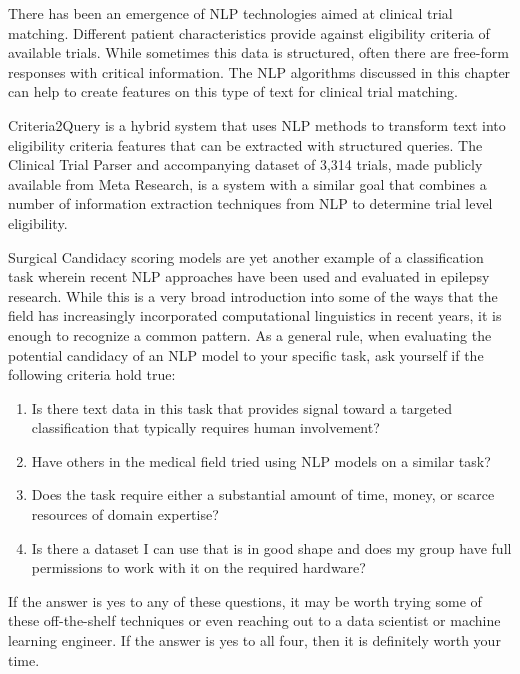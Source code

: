 There has been an emergence of NLP technologies aimed at clinical trial matching. Different patient characteristics provide against eligibility
criteria of available trials. While sometimes this data is structured, often there are free-form responses with critical information. The NLP algorithms discussed in this chapter
can help to create features on this type of text for clinical trial matching.

Criteria2Query \cite{10.1093/jamia/ocy178} is a hybrid system that uses NLP methods to transform text into eligibility criteria features that can
be extracted with structured queries. The Clinical Trial Parser and accompanying dataset of 3,314 trials\cite{tseo2020information}, made
publicly available from Meta Research, is a system with a similar goal that combines a number of information extraction techniques from NLP to determine
trial level eligibility.

Surgical Candidacy scoring models are yet another example of a classification task wherein recent NLP approaches have been used and evaluated \cite{Wissel2019ProspectiveVO}
in epilepsy research. While this is a very broad introduction into some of the ways that the field has increasingly incorporated computational linguistics in recent years, it is enough
to recognize a common pattern. As a general rule, when evaluating the potential candidacy of an NLP model to your specific task, ask yourself if the following criteria hold true:
\begin{enumerate}
  \item Is there text data in this task that provides signal toward a targeted classification that typically requires human involvement?
  \item Have others in the medical field tried using NLP models on a similar task?
  \item Does the task require either a substantial amount of time, money, or scarce resources of domain expertise?
  \item Is there a dataset I can use that is in good shape and does my group have full permissions to work with it on the required hardware?
\end{enumerate}

If the answer is yes to any of these questions, it may be worth trying some of these off-the-shelf techniques or even reaching out to a data scientist or machine learning engineer.
If the answer is yes to all four, then it is definitely worth your time.
